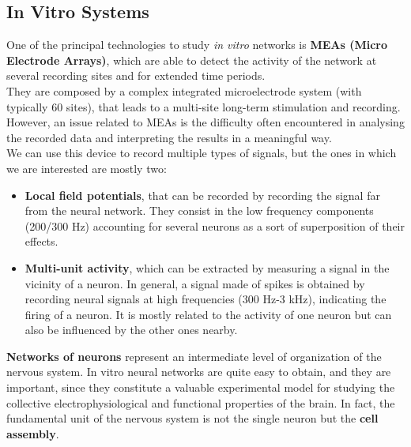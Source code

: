 \subsection{In Vitro Systems}
One of the principal technologies to study \textit{in vitro} networks is 
\textbf{MEAs (Micro Electrode Arrays)}, which are able to detect the 
activity of the network at several recording sites and for extended time 
periods.\\
They are composed by a complex integrated microelectrode system (with 
typically 60 sites), that leads to a multi-site long-term stimulation and 
recording.
However, an issue related to MEAs is the difficulty often encountered in 
analysing the recorded data
and interpreting the results in a meaningful way.\\
We can use this device to record multiple types of signals, but the ones 
in which we are interested are mostly two:
\begin{itemize}
    \item \textbf{Local field potentials}, that can be recorded by 
recording the signal far from the neural network. They consist in the low 
frequency components (200/300 Hz) accounting for several neurons as a sort 
of superposition of their effects.
    \item \textbf{Multi-unit activity}, which can be extracted by 
measuring a signal in the vicinity of a neuron.  In general, a signal made 
of spikes is obtained by recording neural signals at high frequencies (300 
Hz-3 kHz), indicating the firing of a neuron. It is mostly related to the 
activity of one neuron but can also be influenced by the other ones 
nearby.
\end{itemize}

\textbf{Networks of neurons} represent an intermediate level of 
organization of the nervous system. 
In vitro neural networks are quite easy to obtain, and they are important, 
since they constitute a valuable experimental model for studying the 
collective electrophysiological and functional properties of the brain. In 
fact, the fundamental unit of the nervous system is not the single neuron 
but the \textbf{cell assembly}.\\

